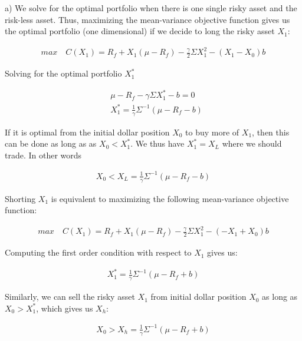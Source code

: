 \documentclass[10pt]{article}
\newenvironment{exercise}[2][Exercise]{\begin{trivlist}
  \item[\hskip \labelsep {\bfseries #1}\hskip \labelsep {\bfseries #2.}]}{\end{trivlist}}
\begin{document}
\newpage

\begin{exercise}{2}
\end{exercise}

a) We solve for the optimal portfolio when there is one single risky asset and the risk-less asset. Thus, maximizing the mean-variance objective function gives us the optimal portfolio (one dimensional) if we decide to long the risky asset $X_1$:

\begin{align*}
	max \quad C(X_1) = R_f + X_1(\mu - R_f) - \frac{\gamma}{2} \Sigma X_1^2 - (X_1 - X_0)b
\end{align*}

Solving for the optimal portfolio $X_1^*$ 

\begin{align*}
	& \mu - R_f - \gamma \Sigma X_1^* - b = 0 \\
	& X_1^* = \frac{1}{\gamma} \Sigma^{-1} (\mu - R_f  - b)
\end{align*}

If it is optimal from the initial dollar position $X_0$ to buy more of $X_1$, then this can be done as long as as $X_0 < X_1^*$. We thus have $X_1^* = X_L$ where we should trade. In other words

\begin{align*}
	X_0 < X_L = \frac{1}{\gamma} \Sigma^{-1} (\mu - R_f  - b)
\end{align*}

Shorting $X_1$ is equivalent to maximizing the following mean-variance objective function:

\begin{align*}
	max \quad C(X_1) = R_f + X_1(\mu - R_f) - \frac{\gamma}{2} \Sigma X_1^2 - (-X_1 + X_0)b
\end{align*}

Computing the first order condition with respect to $X_1$ gives us:

\begin{align*}
	X_1^* =\frac{1}{\gamma} \Sigma^{-1} (\mu - R_f + b)
\end{align*}

Similarly, we can sell the risky asset $X_1$ from initial dollar position $X_0$ as long as $X_0 > X_1^*$, which gives us $X_h$:

\begin{align*}
	X_0 > X_h = \frac{1}{\gamma} \Sigma^{-1} (\mu - R_f + b)
\end{align*}
\end{document}
